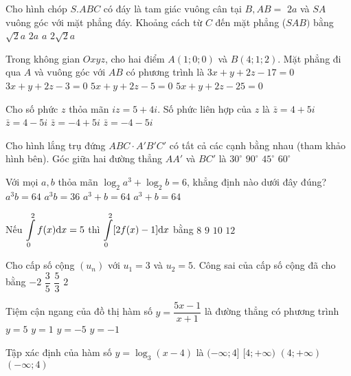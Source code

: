 \begin{ex}%
Cho hình chóp $S.ABC$ có đáy là tam giác vuông cân tại $B, AB=$ $2 a$ và $SA$ vuông góc với mặt phẳng đáy. Khoảng cách từ $C$ đến mặt phẳng ($SAB)$ bằng
\choice
{$\sqrt{2} a$}
{\True $2 a$}
{$a$}
{$2\sqrt{2} a$}

\end{ex}
\begin{ex}%
Trong không gian $O x y z$, cho hai điểm $A(1; 0; 0)$ và $B(4; 1; 2)$. Mặt phẳng đi qua $A$ và vuông góc với $AB$ có phương trình là
\choice
{$3 x+y+2 z-17=0$}
{\True $3 x+y+2 z-3=0$}
{$5 x+y+2 z-5=0$}
{$5 x+y+2 z-25=0$}

\end{ex}
\begin{ex}%
Cho số phức $z$ thỏa mãn $i z=5+4 i$. Số phức liên hợp của $z$ là
\choice
{\True $\bar{z}=4+5 i$}
{$\bar{z}=4-5 i$}
{$\bar{z}=-4+5 i$}
{$\bar{z}=-4-5 i$}

\end{ex}
\begin{ex}%
Cho hình lắng trụ đứng $ABC \cdot A'B'C'$ có tất cả các cạnh bằng nhau (tham khảo hình bên). Góc giữa hai đường thẳng $AA'$ và $BC'$ là
\choice
{$30^{\circ}$}
{$90^{\circ}$}
{\True $45^{\circ}$}
{$60^{\circ}$}

\end{ex}
\begin{ex}%
Với mọi $a, b$ thỏa mãn $\log_2 a^3+\log_2 b=6$, khẳng định nào dưới đây đúng?
\choice
{\True $a^3 b=64$}
{$a^3 b=36$}
{$a^3+b=64$}
{$a^3+b=64$}

\end{ex}
\begin{ex}%
Nếu $\displaystyle\displaystyle\int\limits_0^2 f(x) \mathrm{d} x=5$ thì $\displaystyle\displaystyle\int\limits_0^2[2 f(x)-1] \mathrm{d} x$ bằng
\choice
{\True $8$}
{$9$}
{$10$}
{$12$}

\end{ex}

\begin{ex}%
Cho cấp số cộng $\left(u_n\right)$ với $u_1=3$ và $u_2=5$. Công sai của cấp số cộng đã cho bằng
\choice
{$-2$}
{$\dfrac{3}{5}$}
{$\dfrac{5}{3}$}
{\True $2$}

\end{ex}
\begin{ex}%
Tiệm cận ngang của đồ thị hàm số $y=\dfrac{5 x-1}{x+1}$ là đường thẳng có phương trình
\choice
{\True $y=5$}
{$y=1$}
{$y=-5$}
{$y=-1$}

\end{ex}
\begin{ex}%
Tập xác định của hàm số $y=\log_3(x-4)$ là
\choice
{$(-\infty; 4]$}
{$[4;+\infty)$}
{\True $(4;+\infty)$}
{$(-\infty; 4)$}

\end{ex}

